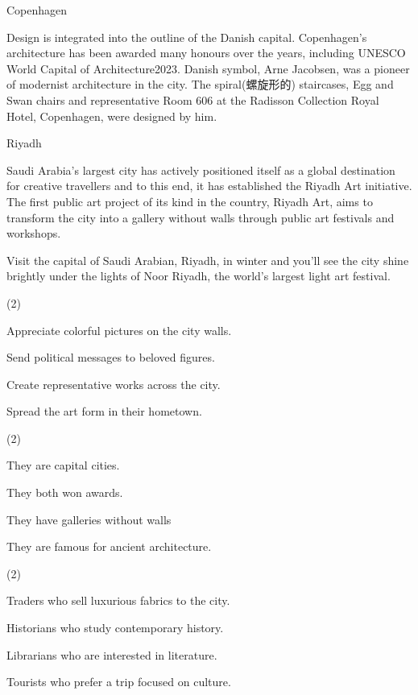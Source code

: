 \documentclass{英语试卷}
\begin{document}
\par Copenhagen\par
\par Design is integrated into the outline of the Danish capital. Copenhagen's architecture has been awarded many honours over the years, including UNESCO World Capital of Architecture2023. Danish symbol, Arne Jacobsen, was a pioneer of modernist architecture in the city. The spiral(螺旋形的) staircases, Egg and Swan chairs and representative Room 606 at the Radisson Collection Royal Hotel, Copenhagen, were designed by him.\par
\par Riyadh\par
\par Saudi Arabia's largest city has actively positioned itself as a global destination for creative travellers and to this end, it has established the Riyadh Art initiative. The first public art project of its kind in the country, Riyadh Art, aims to transform the city into a gallery without walls through public art festivals and workshops.\par
\par Visit the capital of Saudi Arabian, Riyadh, in winter and you'll see the city shine brightly under the lights of Noor Riyadh, the world's largest light art festival.\par
{}
\begin{choices}(2)
  \item Appreciate colorful pictures on the city walls.
  \item Send political messages to beloved figures.
  \item Create representative works across the city.
  \item Spread the art form in their hometown.
\end{choices}
\begin{choices}(2)
  \item They are capital cities.
  \item They both won awards.
  \item They have galleries without walls
  \item They are famous for ancient architecture.
\end{choices}
\begin{choices}(2)
  \item Traders who sell luxurious fabrics to the city.
  \item Historians who study contemporary history.
  \item Librarians who are interested in literature.
  \item Tourists who prefer a trip focused on culture.
\end{choices}
\end{document}
